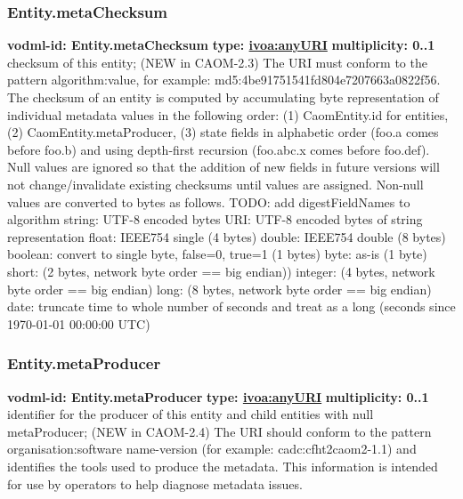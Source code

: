     \subsubsection{Entity.metaChecksum}
      \textbf{vodml-id: Entity.metaChecksum} \newline
      \textbf{type: \hyperref[sect:ivoa]{ivoa:anyURI}} \newline
      \textbf{multiplicity: 0..1} \newline
      checksum of this entity; (NEW in CAOM-2.3) The URI must conform to the pattern {algorithm}:{value}, for example: md5:4be91751541fd804e7207663a0822f56. The checksum of an entity is computed by accumulating byte representation of individual metadata values in the following order: (1) CaomEntity.id for entities, (2) CaomEntity.metaProducer, (3) state fields in alphabetic order (foo.a comes before foo.b) and using depth-first recursion (foo.abc.x comes before foo.def). Null values are ignored so that the addition of new fields in future versions will not change/invalidate existing checksums until values are assigned. Non-null values are converted to bytes as follows. TODO: add digestFieldNames to algorithm string: UTF-8 encoded bytes URI: UTF-8 encoded bytes of string representation float: IEEE754 single (4 bytes) double: IEEE754 double (8 bytes) boolean: convert to single byte, false=0, true=1 (1 bytes) byte: as-is (1 byte) short: (2 bytes, network byte order == big endian)) integer: (4 bytes, network byte order == big endian) long: (8 bytes, network byte order == big endian) date: truncate time to whole number of seconds and treat as a long (seconds since 1970-01-01 00:00:00 UTC)

    \subsubsection{Entity.metaProducer}
      \textbf{vodml-id: Entity.metaProducer} \newline
      \textbf{type: \hyperref[sect:ivoa]{ivoa:anyURI}} \newline
      \textbf{multiplicity: 0..1} \newline
      identifier for the producer of this entity and child entities with null metaProducer; (NEW in CAOM-2.4) The URI should conform to the pattern {organisation}:{software name-version} (for example: cadc:cfht2caom2-1.1) and identifies the tools used to produce the metadata. This information is intended for use by operators to help diagnose metadata issues.

